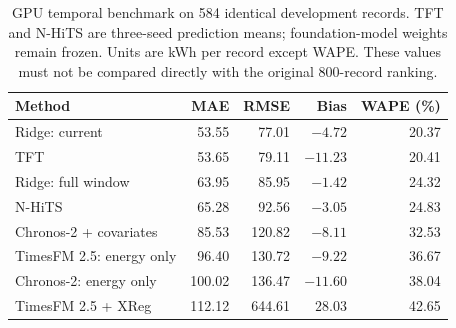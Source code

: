 \begin{table}[!htbp]\centering\small
\caption{GPU temporal benchmark on 584 identical development records. TFT and N-HiTS are three-seed prediction means; foundation-model weights remain frozen. Units are kWh per record except WAPE. These values must not be compared directly with the original 800-record ranking.}\label{tab:gpu}
\begin{tabular}{@{}lrrrr@{}}\toprule
Method & MAE & RMSE & Bias & WAPE (\%)\\\midrule
Ridge: current & 53.55 & 77.01 & $-4.72$ & 20.37\\
TFT & 53.65 & 79.11 & $-11.23$ & 20.41\\
Ridge: full window & 63.95 & 85.95 & $-1.42$ & 24.32\\
N-HiTS & 65.28 & 92.56 & $-3.05$ & 24.83\\
Chronos-2 + covariates & 85.53 & 120.82 & $-8.11$ & 32.53\\
TimesFM 2.5: energy only & 96.40 & 130.72 & $-9.22$ & 36.67\\
Chronos-2: energy only & 100.02 & 136.47 & $-11.60$ & 38.04\\
TimesFM 2.5 + XReg & 112.12 & 644.61 & $28.03$ & 42.65\\\bottomrule
\end{tabular}\end{table}
